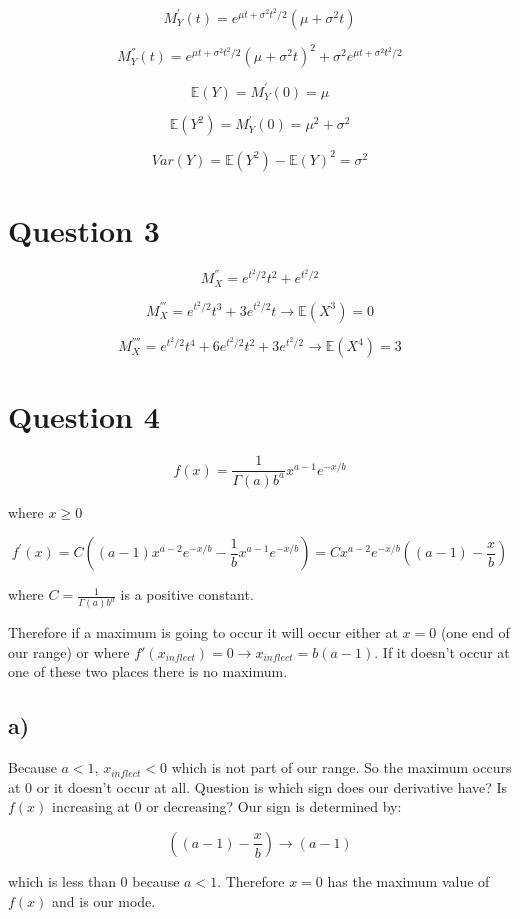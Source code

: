 \documentclass[11pt]{article}
\begin{document}
$$M_Y^{'}(t) = e^{\mu t + \sigma^2 t^2 / 2}(\mu + \sigma^2 t)$$

$$M_Y^{''}(t) = e^{\mu t + \sigma^2 t^2 / 2}(\mu + \sigma^2 t)^2+\sigma^2e^{\mu t + \sigma^2 t^2 / 2}$$

$$\mathbb{E}(Y) = M_Y^{'}(0) =\mu$$

$$\mathbb{E}(Y^2) = M_Y^{'}(0) =\mu^2 + \sigma^2$$

$$Var(Y) = \mathbb{E}(Y^2) - \mathbb{E}(Y)^2 = \sigma^2$$

\section*{Question 3}

$$M_X^{''} = e^{t^2 / 2}t^2+e^{t^2 / 2}$$


$$M_X^{'''} = e^{t^2 / 2}t^3 + 3e^{t^2 / 2}t\rightarrow \mathbb{E}(X^3) = 0$$

$$M_X^{''''} = e^{t^2 / 2}t^4 + 6e^{t^2 / 2}t^2 +3e^{t^2 /2}\rightarrow \mathbb{E}(X^4)=3$$

\section*{Question 4}

$$f(x) = \frac{1}{\Gamma(a)b^a}x^{a-1}e^{-x/b}$$

where $x\geq 0$

$$f^{'}(x) = C\left( (a-1)x^{a-2}e^{-x/b} -\frac{1}{b}x^{a-1}e^{-x/b}\right)=Cx^{a-2}e^{-x/b}\left( (a-1) - \frac{x}{b} \right)$$

where $C=\frac{1}{\Gamma(a)b^a}$ is a positive constant. 

Therefore if a maximum is going to occur it will occur either at $x=0$ (one end of our range) or where $f'(x_{inflect})=0\rightarrow x_{inflect}=b(a-1)$. If it doesn't occur at one of these two places there is no maximum. 

\subsection*{a)}

Because $a<1$, $x_{inflect}<0$ which is not part of our range. So the maximum occurs at 0 or it doesn't occur at all. Question is which sign does our derivative have? Is $f(x)$ increasing at 0 or decreasing? Our sign is determined by:

$$\left( (a-1) - \frac{x}{b} \right)\rightarrow (a - 1)$$

which is less than 0 because $a<1$. Therefore $x=0$ has the maximum value of $f(x)$ and is our mode. 
\end{document}
